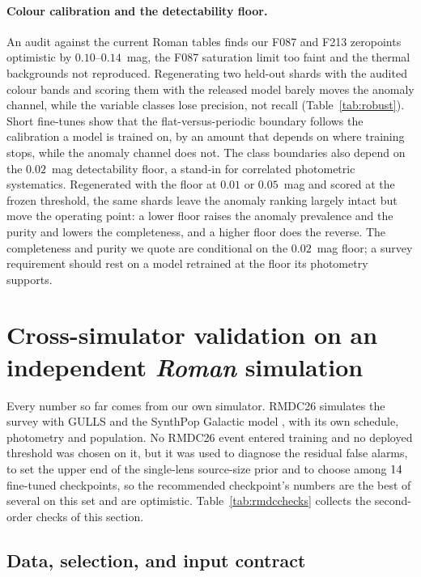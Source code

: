 \documentclass[twocolumn,linenumbers,floatfix,twocolappendix]{aastex701}
\newcommand{\Rom}{\textit{Roman}}
\begin{document}
\paragraph{Colour calibration and the detectability floor.} An audit against the current Roman tables
\citep{RomanTechInfo} finds our F087 and F213 zeropoints optimistic by $0.10$--$0.14$~mag, the F087 saturation limit
too faint and the thermal backgrounds not reproduced.
Regenerating two held-out shards with the audited colour bands and scoring them with the released model barely moves
the anomaly channel, while the variable classes lose precision, not recall (Table~\ref{tab:robust}). Short fine-tunes
show that the flat-versus-periodic boundary follows the calibration a model is trained on, by an amount that depends
on where training stops, while the anomaly channel does not.
The class boundaries also depend on the $0.02$~mag detectability floor, a stand-in for correlated photometric
systematics. Regenerated with the floor at $0.01$ or $0.05$~mag and scored at the frozen threshold, the same shards
leave the anomaly ranking largely intact but move the operating point: a lower floor raises the anomaly prevalence and the purity
and lowers the completeness, and a higher floor does the reverse. The completeness and purity we quote are conditional
on the $0.02$~mag floor; a survey requirement should rest on a model retrained at the floor its photometry supports.

\section{Cross-simulator validation on an independent \Rom{} simulation}\label{sec:gulls}

Every number so far comes from our own simulator. RMDC26 \citep{RGESPIT2026} simulates the survey with GULLS
\citep{Penny2013,Penny2019} and the SynthPop Galactic model \citep{Kluter2025}, with its own schedule, photometry and
population. No RMDC26 event entered training and no deployed threshold was chosen on it, but it was used to diagnose
the residual false alarms, to set the upper end of the single-lens source-size prior and to choose among
$14$ fine-tuned checkpoints, so the recommended checkpoint's numbers are the best of several on this
set and are optimistic. Table~\ref{tab:rmdcchecks} collects the second-order checks of this section.

\subsection{Data, selection, and input contract}
\end{document}
